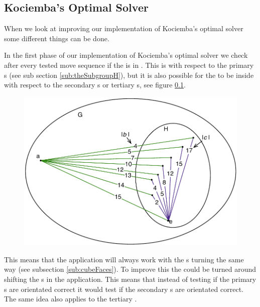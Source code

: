 \subsection{Kociemba's Optimal Solver}
When we look at improving our implementation of Kociemba's optimal solver some different things can be done.
	
In the first phase of our implementation of Kociemba's optimal solver we check after every tested move sequence if the \cube{} is in .
This  is with respect to the primary \face{}s (see sub section \ref{sub:theSubgroupH}), but it is also possible for the \rubik{} to be inside  with respect to the secondary \face{}s or tertiary \face{}s, see figure \ref{}.

\begin{figure}
	\centering
	\includegraphics[scale=0.75]{input/pics/kocieambe2.pdf}
	\caption{}
	\label{fig:kociemba2}
\end{figure}

This means that the application will always work with the \face{}s turning the same way (see subsection \ref{sub:cubeFaces}).
To improve this the \rubik{} could be turned around shifting the \face{}s in the application.
This means that instead of testing if the primary \face{} \cubie{}s are orientated correct it would test if the secondary \face{} \cubie{}s are orientated correct. 
The same idea also applies to the tertiary \face{}.
	
